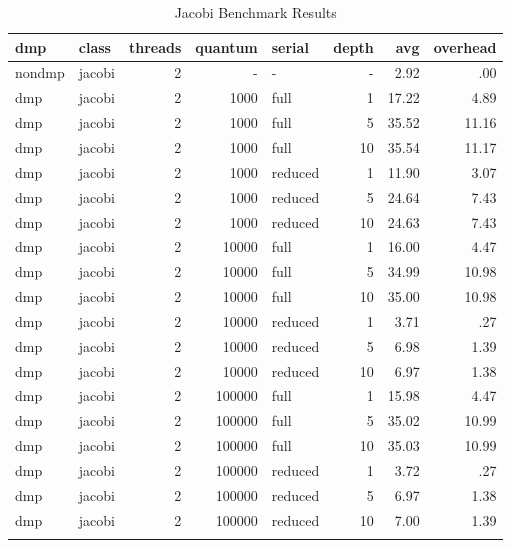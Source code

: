 \begin{center}
\begin{small}
\begin{longtable}{llrrlrrr}
\hline
dmp & class & threads & quantum & serial & depth & avg & overhead\\
\hline
nondmp & jacobi & 2 & - & - & - & 2.92 & .00\\
dmp & jacobi & 2 & 1000 & full & 1 & 17.22 & 4.89\\
dmp & jacobi & 2 & 1000 & full & 5 & 35.52 & 11.16\\
dmp & jacobi & 2 & 1000 & full & 10 & 35.54 & 11.17\\
dmp & jacobi & 2 & 1000 & reduced & 1 & 11.90 & 3.07\\
dmp & jacobi & 2 & 1000 & reduced & 5 & 24.64 & 7.43\\
dmp & jacobi & 2 & 1000 & reduced & 10 & 24.63 & 7.43\\
dmp & jacobi & 2 & 10000 & full & 1 & 16.00 & 4.47\\
dmp & jacobi & 2 & 10000 & full & 5 & 34.99 & 10.98\\
dmp & jacobi & 2 & 10000 & full & 10 & 35.00 & 10.98\\
dmp & jacobi & 2 & 10000 & reduced & 1 & 3.71 & .27\\
dmp & jacobi & 2 & 10000 & reduced & 5 & 6.98 & 1.39\\
dmp & jacobi & 2 & 10000 & reduced & 10 & 6.97 & 1.38\\
dmp & jacobi & 2 & 100000 & full & 1 & 15.98 & 4.47\\
dmp & jacobi & 2 & 100000 & full & 5 & 35.02 & 10.99\\
dmp & jacobi & 2 & 100000 & full & 10 & 35.03 & 10.99\\
dmp & jacobi & 2 & 100000 & reduced & 1 & 3.72 & .27\\
dmp & jacobi & 2 & 100000 & reduced & 5 & 6.97 & 1.38\\
dmp & jacobi & 2 & 100000 & reduced & 10 & 7.00 & 1.39\\
\hline
\caption{Jacobi Benchmark Results}
\label{tab:jacobi_results}
\end{longtable}
\end{small}
\end{center}

